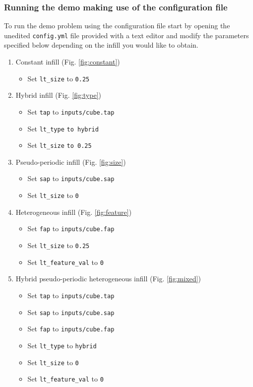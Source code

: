 \subsubsection{Running the demo making use of the configuration file} \label{sec:demo config}
To run the demo problem using the configuration file start by opening the unedited \texttt{config.yml} file provided with a text editor and modify the parameters specified below depending on the infill you would like to obtain.
\begin{enumerate}[label=\alph*)]
	\item Constant infill (Fig. \ref{fig:constant})
	\begin{itemize}
		\item Set {\tt lt\_size} to {\tt 0.25}
	\end{itemize}	
	\item Hybrid infill (Fig. \ref{fig:type})
	\begin{itemize}
		\item Set {\tt tap} to {\tt inputs/cube.tap}
		\item Set {\tt lt\_type} {\tt to hybrid}
		\item Set {\tt lt\_size} {\tt to 0.25}
	\end{itemize}
	\item Pseudo-periodic infill (Fig. \ref{fig:size})
	\begin{itemize}
		\item Set {\tt sap} to {\tt inputs/cube.sap}
		\item Set {\tt lt\_size} to {\tt 0}
	\end{itemize}
	\item Heterogeneous infill (Fig. \ref{fig:feature})
	\begin{itemize}
		\item Set {\tt fap} to {\tt inputs/cube.fap}
		\item Set {\tt lt\_size} to {\tt 0.25}
		\item Set {\tt lt\_feature\_val} to {\tt 0}
	\end{itemize}
	\item Hybrid pseudo-periodic heterogeneous infill  (Fig. \ref{fig:mixed})
	\begin{itemize}
		\item Set {\tt tap} to {\tt inputs/cube.tap}
		\item Set {\tt sap} to {\tt inputs/cube.sap}
		\item Set {\tt fap} to {\tt inputs/cube.fap}
		\item Set {\tt lt\_type} to {\tt hybrid}
		\item Set {\tt lt\_size} to {\tt 0}
		\item Set {\tt lt\_feature\_val} to {\tt 0}
	\end{itemize}
\end{enumerate}

